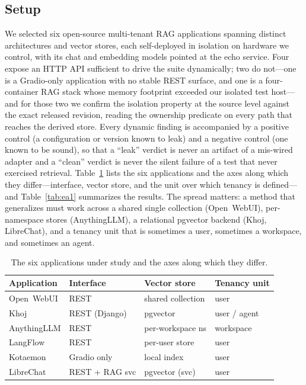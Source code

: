 \IfFileExists{IEEEtran.cls}{\documentclass[conference]{IEEEtran}}{\documentclass[10pt,twocolumn]{article}}
\begin{document}
\subsection{Setup}
We selected six open-source multi-tenant RAG applications spanning distinct architectures and vector
stores, each self-deployed in isolation on hardware we control, with its chat and embedding models
pointed at the echo service. Four expose an HTTP API sufficient to drive the suite dynamically; two
do not---one is a Gradio-only application with no stable REST surface, and one is a four-container
RAG stack whose memory footprint exceeded our isolated test host---and for those two we confirm the
isolation property at the source level against the exact released revision, reading the ownership
predicate on every path that reaches the derived store. Every dynamic finding is accompanied by a
positive control (a configuration or version known to leak) and a negative control (one known to be
sound), so that a ``leak'' verdict is never an artifact of a mis-wired adapter and a ``clean''
verdict is never the silent failure of a test that never exercised retrieval.
Table~\ref{tab:apps} lists the six applications and the axes along which they differ---interface,
vector store, and the unit over which tenancy is defined---and Table~\ref{tab:ea1} summarizes the
results. The spread matters: a method that generalizes must work across a shared single collection
(Open~WebUI), per-namespace stores (AnythingLLM), a relational pgvector backend (Khoj, LibreChat),
and a tenancy unit that is sometimes a user, sometimes a workspace, and sometimes an agent.

\begin{table}[t]\centering\small
\setlength{\tabcolsep}{4pt}
\caption{The six applications under study and the axes along which they differ.}
\label{tab:apps}
\begin{tabular}{@{}l l l l@{}}
\toprule
Application & Interface & Vector store & Tenancy unit \\
\midrule
Open~WebUI & REST & shared collection & user \\
Khoj & REST (Django) & pgvector & user / agent \\
AnythingLLM & REST & per-workspace ns & workspace \\
LangFlow & REST & per-user store & user \\
Kotaemon & Gradio only & local index & user \\
LibreChat & REST + RAG svc & pgvector (svc) & user \\
\bottomrule
\end{tabular}
\end{table}
\end{document}
